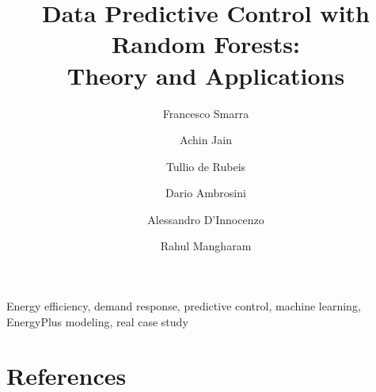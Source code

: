 \documentclass[review]{elsarticle}
\begin{document}
\begin{frontmatter}

\title{Data Predictive Control with Random Forests:\\Theory and Applications}

\author[FSaddress,EC]{Francesco Smarra}

\author[AJaddress,EC]{Achin Jain}
\author[TDRaddress,EC]{Tullio de Rubeis}
\author[TDRaddress]{Dario Ambrosini}
\author[FSaddress]{Alessandro D'Innocenzo}
\author[AJaddress]{Rahul Mangharam}

\address[FSaddress]{Department of Information Engineering, Computer Science and Mathematics, Universit\`{a} degli Studi dell'Aquila, L'Aquila, Italy}
\address[AJaddress]{Department of Electrical and Systems Engineering, University of Pennsylvania, Philadelphia, USA}
\address[TDRaddress]{Department of Industrial and Information Engineering and Economics, Universit\`{a} degli Studi dell'Aquila, L'Aquila, Italy}
\address[EC]{Equal contribution}

\begin{abstract}

\end{abstract}

\begin{keyword}
Energy efficiency, demand response, predictive control, machine learning, EnergyPlus modeling, real case study
\end{keyword}

\end{frontmatter}
















\section*{References}


\end{document}
